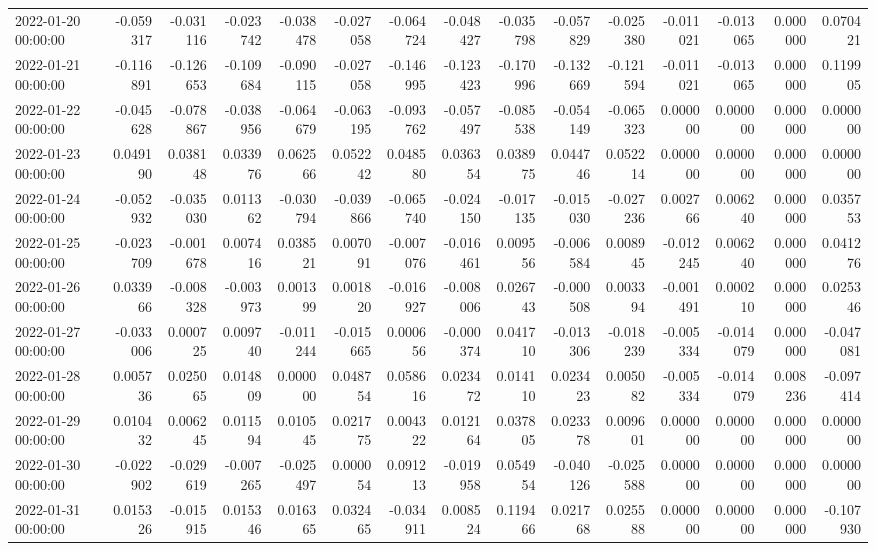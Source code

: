 \begin{tabular}{lrrrrrrrrrrrrrr}
2022-01-20 00:00:00 & -0.059317 & -0.031116 & -0.023742 & -0.038478 & -0.027058 & -0.064724 & -0.048427 & -0.035798 & -0.057829 & -0.025380 & -0.011021 & -0.013065 & 0.000000 & 0.070421 \\
2022-01-21 00:00:00 & -0.116891 & -0.126653 & -0.109684 & -0.090115 & -0.027058 & -0.146995 & -0.123423 & -0.170996 & -0.132669 & -0.121594 & -0.011021 & -0.013065 & 0.000000 & 0.119905 \\
2022-01-22 00:00:00 & -0.045628 & -0.078867 & -0.038956 & -0.064679 & -0.063195 & -0.093762 & -0.057497 & -0.085538 & -0.054149 & -0.065323 & 0.000000 & 0.000000 & 0.000000 & 0.000000 \\
2022-01-23 00:00:00 & 0.049190 & 0.038148 & 0.033976 & 0.062566 & 0.052242 & 0.048580 & 0.036354 & 0.038975 & 0.044746 & 0.052214 & 0.000000 & 0.000000 & 0.000000 & 0.000000 \\
2022-01-24 00:00:00 & -0.052932 & -0.035030 & 0.011362 & -0.030794 & -0.039866 & -0.065740 & -0.024150 & -0.017135 & -0.015030 & -0.027236 & 0.002766 & 0.006240 & 0.000000 & 0.035753 \\
2022-01-25 00:00:00 & -0.023709 & -0.001678 & 0.007416 & 0.038521 & 0.007091 & -0.007076 & -0.016461 & 0.009556 & -0.006584 & 0.008945 & -0.012245 & 0.006240 & 0.000000 & 0.041276 \\
2022-01-26 00:00:00 & 0.033966 & -0.008328 & -0.003973 & 0.001399 & 0.001820 & -0.016927 & -0.008006 & 0.026743 & -0.000508 & 0.003394 & -0.001491 & 0.000210 & 0.000000 & 0.025346 \\
2022-01-27 00:00:00 & -0.033006 & 0.000725 & 0.009740 & -0.011244 & -0.015665 & 0.000656 & -0.000374 & 0.041710 & -0.013306 & -0.018239 & -0.005334 & -0.014079 & 0.000000 & -0.047081 \\
2022-01-28 00:00:00 & 0.005736 & 0.025065 & 0.014809 & 0.000000 & 0.048754 & 0.058616 & 0.023472 & 0.014110 & 0.023423 & 0.005082 & -0.005334 & -0.014079 & 0.008236 & -0.097414 \\
2022-01-29 00:00:00 & 0.010432 & 0.006245 & 0.011594 & 0.010545 & 0.021775 & 0.004322 & 0.012164 & 0.037805 & 0.023378 & 0.009601 & 0.000000 & 0.000000 & 0.000000 & 0.000000 \\
2022-01-30 00:00:00 & -0.022902 & -0.029619 & -0.007265 & -0.025497 & 0.000054 & 0.091213 & -0.019958 & 0.054954 & -0.040126 & -0.025588 & 0.000000 & 0.000000 & 0.000000 & 0.000000 \\
2022-01-31 00:00:00 & 0.015326 & -0.015915 & 0.015346 & 0.016365 & 0.032465 & -0.034911 & 0.008524 & 0.119466 & 0.021768 & 0.025588 & 0.000000 & 0.000000 & 0.000000 & -0.107930 \\

\end{tabular}
